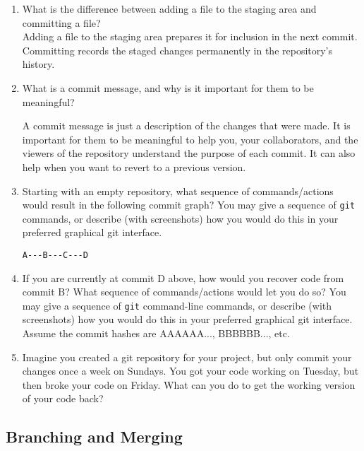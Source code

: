 \documentclass[10pt,twocolumn]{article}
\begin{document}
\begin{enumerate}
\item What is the difference between adding a file to the staging area and committing a file?
\\
Adding a file to the staging area prepares it for inclusion in the next commit. Committing records the staged changes permanently in the repository's history.
\item What is a commit message, and why is it important for them to be meaningful?

A commit message is just a description of the changes that were made. It is important for them to be meaningful to help you, your collaborators, and the viewers of the repository understand the purpose of each commit. It can also help when you want to revert to a previous version.
\item Starting with an empty repository, what sequence of commands/actions would result in the following commit graph? You may give a sequence of \texttt{git} commands, or describe (with screenshots) how you would do this in your preferred graphical git interface.
\begin{verbatim}
A---B---C---D
\end{verbatim}
\item If you are currently at commit D above, how would you recover code from commit B? What sequence of commands/actions would let you do so? You may give a sequence of \texttt{git} command-line commands, or describe (with screenshots) how you would do this in your preferred graphical git interface. Assume the commit hashes are AAAAAA..., BBBBBB..., etc.
\item Imagine you created a git repository for your project, but only commit your changes once a week on Sundays. You got your code working on Tuesday, but then broke your code on Friday. What can you do to get the working version of your code back?
\end{enumerate}

\subsection{Branching and Merging}
\end{document}
